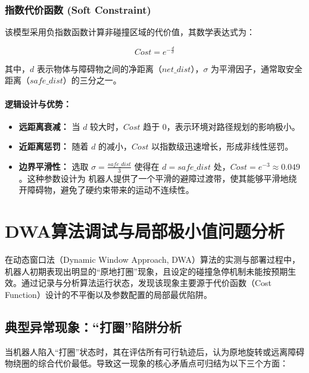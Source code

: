\subsubsection{指数代价函数 (Soft Constraint)}

该模型采用负指数函数计算非碰撞区域的代价值，其数学表达式为：

\begin{equation}
Cost = e^{-\frac{d}{\sigma}}
\end{equation}

其中，$d$ 表示物体与障碍物之间的净距离（$net\_dist$），$\sigma$ 为平滑因子，通常取安全距离（$safe\_dist$）的三分之一。

\paragraph{逻辑设计与优势：}
\begin{itemize}
    \item \textbf{远距离衰减：} 当 $d$ 较大时，$Cost$ 趋于 $0$，表示环境对路径规划的影响极小。
    \item \textbf{近距离惩罚：} 随着 $d$ 的减小，$Cost$ 以指数级迅速增长，形成非线性惩罚。
    \item \textbf{边界平滑性：} 选取 $\sigma = \frac{safe\_dist}{3}$ 使得在 $d = safe\_dist$ 处，$Cost = e^{-3} \approx 0.049$。这种参数设计为
    机器人提供了一个平滑的避障过渡带，使其能够平滑地绕开障碍物，避免了硬约束带来的运动不连续性。
\end{itemize}

\section{DWA算法调试与局部极小值问题分析}

在动态窗口法（Dynamic Window Approach, DWA）算法的实测与部署过程中，机器人初期表现出明显的“原地打圈”现象，且设定的碰撞急停机制未能按预期生效。通过记录与分析算法运行状态，发现该现象主要源于代价函数（Cost Function）设计的不平衡以及参数配置的局部最优陷阱。

\subsection{典型异常现象：“打圈”陷阱分析}

当机器人陷入“打圈”状态时，其在评估所有可行轨迹后，认为原地旋转或远离障碍物绕圈的综合代价最低。导致这一现象的核心矛盾点可归结为以下三个方面：

